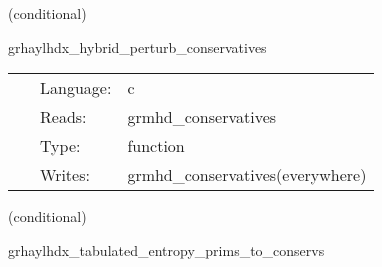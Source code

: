 \vspace{5mm}

   (conditional) 

\hspace{5mm} grhaylhdx\_hybrid\_perturb\_conservatives 

\hspace{5mm}{\it hybrid version of grhaylhdx\_perturb\_conservatives } 


\hspace{5mm}

 \begin{tabular*}{160mm}{cll} 
~ & Language:  & c \\ 
~ & Reads:  & grmhd\_conservatives \\ 
~ & Type:  & function \\ 
~ & Writes:  & grmhd\_conservatives(everywhere) \\ 
\end{tabular*} 


\vspace{5mm}

   (conditional) 

\hspace{5mm} grhaylhdx\_tabulated\_entropy\_prims\_to\_conservs 

\hspace{5mm}{\it entropy+tabulated version of grhaylhdx\_prims\_to\_conservs } 


\hspace{5mm}

